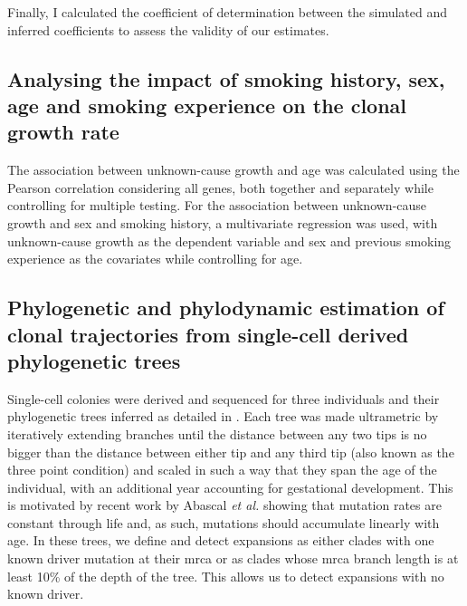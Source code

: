 Finally, I calculated the coefficient of determination between the simulated and inferred coefficients to assess the validity of our estimates.

\subsection{Analysing the impact of smoking history, sex, age and smoking experience on the clonal growth rate}

The association between unknown-cause growth and age was calculated using the Pearson correlation considering all genes, both together and separately while controlling for multiple testing. For the association between unknown-cause growth and sex and smoking history, a multivariate regression was used, with unknown-cause growth as the dependent variable and sex and previous smoking experience as the covariates while controlling for age.

\subsection{Phylogenetic and phylodynamic estimation of clonal trajectories from single-cell derived phylogenetic trees}

Single-cell colonies were derived and sequenced for three individuals and their phylogenetic trees inferred as detailed in \cite{Fabre2021-uw}. Each tree was made ultrametric by iteratively extending branches until the distance between any two tips is no bigger than the distance between either tip and any third tip (also known as the three point condition) and scaled in such a way that they span the age of the individual, with an additional year accounting for gestational development. This is motivated by recent work by Abascal \textit{et al.} showing that mutation rates are constant through life \cite{Abascal_2021_gjvqfm} and, as such, mutations should accumulate linearly with age. In these trees, we define and detect expansions as either clades with one known driver mutation at their \ac{mrca} or as clades whose \ac{mrca} branch length is at least 10\% of the depth of the tree. This allows us to detect expansions with no known driver. 

